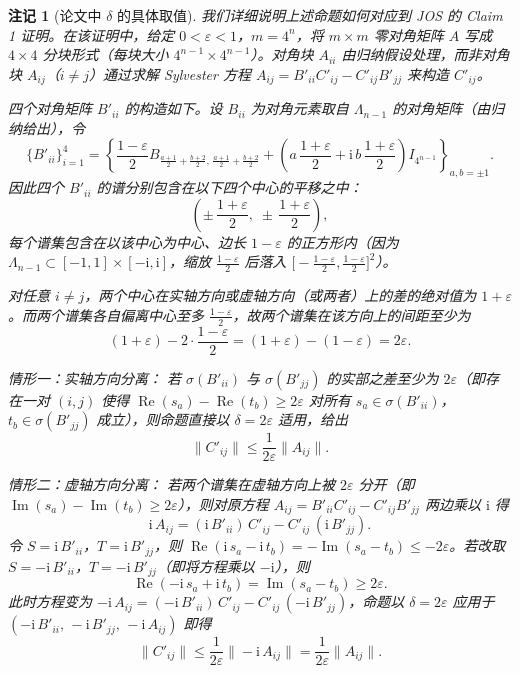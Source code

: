 \documentclass[11pt]{article}
\newtheorem{remark}{注记}
\begin{document}
\begin{remark}[论文中 $\delta$ 的具体取值]
我们详细说明上述命题如何对应到 JOS 的 Claim 1 证明。在该证明中，给定 $0 < \varepsilon < 1$，$m = 4^n$，将 $m \times m$ 零对角矩阵 $A$ 写成 $4 \times 4$ 分块形式（每块大小 $4^{n-1} \times 4^{n-1}$）。对角块 $A_{ii}$ 由归纳假设处理，而非对角块 $A_{ij}$（$i \ne j$）通过求解 Sylvester 方程 $A_{ij} = B'_{ii} C'_{ij} - C'_{ij} B'_{jj}$ 来构造 $C'_{ij}$。

四个对角矩阵 $B'_{ii}$ 的构造如下。设 $B_{ii}$ 为对角元素取自 $\Lambda_{n-1}$ 的对角矩阵（由归纳给出），令
\[
\{B'_{ii}\}_{i=1}^4 = \left\{ \frac{1 - \varepsilon}{2} B_{\frac{a+1}{2} + \frac{b+2}{2},\, \frac{a+1}{2} + \frac{b+2}{2}} + \left( a\, \frac{1 + \varepsilon}{2} + \mathrm{i}\, b\, \frac{1 + \varepsilon}{2} \right) I_{4^{n-1}} \right\}_{a, b = \pm 1}.
\]
因此四个 $B'_{ii}$ 的谱分别包含在以下四个中心的平移之中：
\[
\left( \pm\, \frac{1 + \varepsilon}{2},\; \pm\, \frac{1 + \varepsilon}{2} \right),
\]
每个谱集包含在以该中心为中心、边长 $1 - \varepsilon$ 的正方形内（因为 $\Lambda_{n-1} \subset [-1, 1] \times [-\mathrm{i}, \mathrm{i}]$，缩放 $\frac{1-\varepsilon}{2}$ 后落入 $\bigl[ -\frac{1-\varepsilon}{2}, \frac{1-\varepsilon}{2} \bigr]^2$）。

对任意 $i \ne j$，两个中心在实轴方向或虚轴方向（或两者）上的差的绝对值为 $1 + \varepsilon$。而两个谱集各自偏离中心至多 $\frac{1-\varepsilon}{2}$，故两个谱集在该方向上的间距至少为
\[
(1 + \varepsilon) - 2 \cdot \frac{1 - \varepsilon}{2} = (1 + \varepsilon) - (1 - \varepsilon) = 2\varepsilon.
\]

\emph{情形一：实轴方向分离：} 若 $\sigma(B'_{ii})$ 与 $\sigma(B'_{jj})$ 的实部之差至少为 $2\varepsilon$（即存在一对 $(i, j)$ 使得 $\operatorname{Re}(s_a) - \operatorname{Re}(t_b) \ge 2\varepsilon$ 对所有 $s_a \in \sigma(B'_{ii})$，$t_b \in \sigma(B'_{jj})$ 成立），则命题直接以 $\delta = 2\varepsilon$ 适用，给出
\[
\| C'_{ij} \| \le \frac{1}{2\varepsilon} \| A_{ij} \|.
\]

\emph{情形二：虚轴方向分离：} 若两个谱集在虚轴方向上被 $2\varepsilon$ 分开（即 $\operatorname{Im}(s_a) - \operatorname{Im}(t_b) \ge 2\varepsilon$），则对原方程 $A_{ij} = B'_{ii} C'_{ij} - C'_{ij} B'_{jj}$ 两边乘以 $\mathrm{i}$ 得
\[
\mathrm{i}\, A_{ij} = (\mathrm{i}\, B'_{ii})\, C'_{ij} - C'_{ij}\, (\mathrm{i}\, B'_{jj}).
\]
令 $S = \mathrm{i}\, B'_{ii}$，$T = \mathrm{i}\, B'_{jj}$，则 $\operatorname{Re}(\mathrm{i}\, s_a - \mathrm{i}\, t_b) = -\operatorname{Im}(s_a - t_b) \le -2\varepsilon$。若改取 $S = -\mathrm{i}\, B'_{ii}$，$T = -\mathrm{i}\, B'_{jj}$（即将方程乘以 $-\mathrm{i}$），则
\[
\operatorname{Re}(-\mathrm{i}\, s_a + \mathrm{i}\, t_b) = \operatorname{Im}(s_a - t_b) \ge 2\varepsilon.
\]
此时方程变为 $-\mathrm{i}\, A_{ij} = (-\mathrm{i}\, B'_{ii})\, C'_{ij} - C'_{ij}\, (-\mathrm{i}\, B'_{jj})$，命题以 $\delta = 2\varepsilon$ 应用于 $(-\mathrm{i}\, B'_{ii},\, -\mathrm{i}\, B'_{jj},\, -\mathrm{i}\, A_{ij})$ 即得
\[
\| C'_{ij} \| \le \frac{1}{2\varepsilon} \| -\mathrm{i}\, A_{ij} \| = \frac{1}{2\varepsilon} \| A_{ij} \|.
\]
\end{remark}
\end{document}
